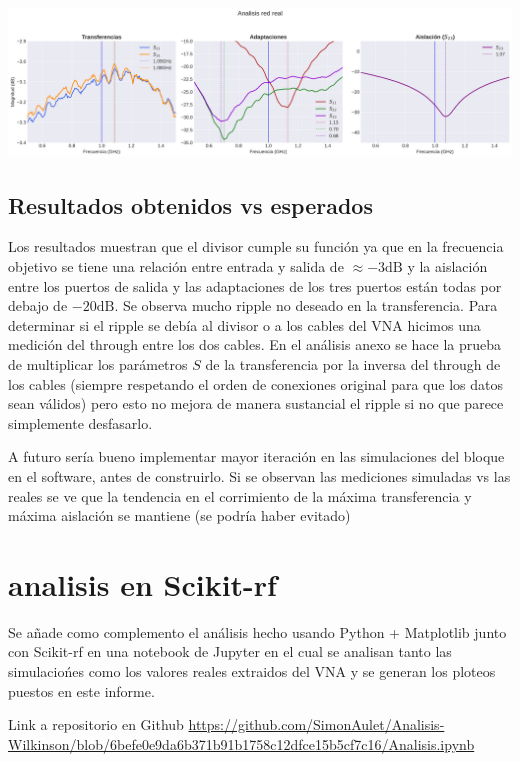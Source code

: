 \documentclass[a4paper, 12pt]{article}
\begin{document}
\includegraphics[width=1\linewidth]{./img/plot-real.png}

\subsection{Resultados obtenidos vs esperados}
Los resultados muestran que el divisor cumple su función ya que en la frecuencia objetivo se tiene una relación entre entrada y salida de $\approx -3\text{dB}$ y la aislación entre los puertos de salida y las adaptaciones de los tres puertos están todas por debajo de $-20\text{dB}$. Se observa mucho ripple no deseado en la transferencia. Para determinar si el ripple se debía al divisor o a los cables del VNA hicimos una medición del through entre los dos cables. En el análisis anexo se hace la prueba de multiplicar los parámetros $S$ de la transferencia por la inversa del through de los cables (siempre respetando el orden de conexiones original para que los datos sean válidos) pero esto no mejora de manera sustancial el ripple si no que parece simplemente desfasarlo.

A futuro sería bueno implementar mayor iteración en las simulaciones del bloque en el software, antes de construirlo. Si se observan las mediciones simuladas vs las reales se ve que la tendencia en el corrimiento de la máxima transferencia y máxima aislación se mantiene (se podría haber evitado)

\section*{analisis en Scikit-rf}
Se añade como complemento el análisis hecho usando Python + Matplotlib junto con Scikit-rf en una notebook de Jupyter en el cual se analisan tanto las simulaciońes como los valores reales extraidos del VNA y se generan los ploteos puestos en este informe.

Link a repositorio en Github \url{https://github.com/SimonAulet/Analisis-Wilkinson/blob/6befe0e9da6b371b91b1758c12dfce15b5cf7c16/Analisis.ipynb}
\end{document}
